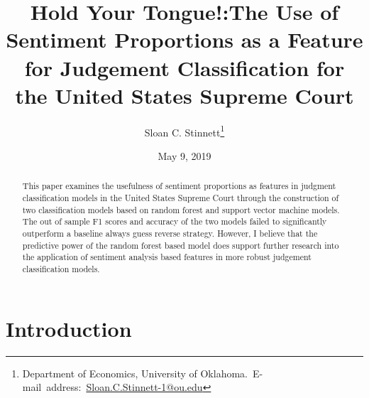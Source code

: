 \documentclass[12pt,english]{article}
\begin{document}
\begin{singlespace}
\title{Hold Your Tongue!:The Use of Sentiment Proportions as a Feature for Judgement Classification for the United States Supreme Court}
\end{singlespace}

\author{Sloan C. Stinnett\thanks{Department of Economics, University of Oklahoma.\
E-mail~address:~\href{mailto:student.name@ou.edu}{Sloan.C.Stinnett-1@ou.edu}}}

\date{May 9, 2019}

\maketitle

\begin{abstract}
\begin{singlespace}
This paper examines the usefulness of sentiment proportions as features in judgment classification models in the United States Supreme Court through the construction of two classification models based on random forest and support vector machine models. The out of sample F1 scores and accuracy of the two models failed to significantly outperform a baseline always guess reverse strategy. However, I believe that the predictive power of the random forest based model does support further research into the application of sentiment analysis based features in more robust judgement classification models.

\end{singlespace}
\end{abstract}
\vfill{}


\pagebreak{}
\maketitle

\section{Introduction}
\end{document}

